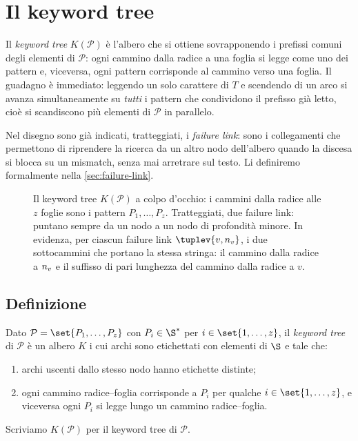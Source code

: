 \section{Il keyword tree}
\label{sec:keyword-tree}

Il \emph{keyword tree} $K(\mathcal{P})$ è l'albero che si ottiene sovrapponendo i prefissi
comuni degli elementi di $\mathcal{P}$: ogni cammino dalla radice a una foglia si legge come
uno dei pattern e, viceversa, ogni pattern corrisponde al cammino verso una foglia. Il
guadagno è immediato: leggendo un solo carattere di $T$ e scendendo di un arco si avanza
simultaneamente su \emph{tutti} i pattern che condividono il prefisso già letto, cioè si
scandiscono più elementi di $\mathcal{P}$ in parallelo.

Nel disegno sono già indicati, tratteggiati, i \emph{failure link}: sono i collegamenti che
permettono di riprendere la ricerca da un altro nodo dell'albero quando la discesa si blocca
su un mismatch, senza mai arretrare sul testo. Li definiremo formalmente nella
\autoref{sec:failure-link}.

\begin{figure}[H]
\centering

\caption{Il keyword tree $K(\mathcal{P})$ a colpo d'occhio: i cammini dalla radice alle $z$
foglie sono i pattern $P_1,\dots,P_z$. Tratteggiati, due failure link: puntano sempre da un
nodo a un nodo di profondità minore. In evidenza, per ciascun failure link
$\tuplev{v, \nv{v}}$, i due sottocammini che portano la stessa stringa: il cammino dalla
radice a $n_{v}$ e il suffisso di pari lunghezza del cammino dalla radice a $v$.}
\label{fig:keyword-tree-panoramica}
\end{figure}

\subsection{Definizione}


\begin{definizione}\label{def:keyword-tree}
Dato $\mathcal{P} = \set{P_1, \dots, P_z}$ con $P_i \in \S^{*}$ per
$i \in \set{1, \dots, z}$, il \emph{keyword tree} di $\mathcal{P}$ è un albero $K$ i cui
archi sono etichettati con elementi di $\S$ e tale che:
\begin{enumerate}
  \item archi uscenti dallo stesso nodo hanno etichette distinte;
  \item ogni cammino radice--foglia corrisponde a $P_i$ per qualche $i \in \set{1,\dots,z}$,
        e viceversa ogni $P_i$ si legge lungo un cammino radice--foglia.
\end{enumerate}
Scriviamo $K(\mathcal{P})$ per il keyword tree di $\mathcal{P}$.
\end{definizione}

